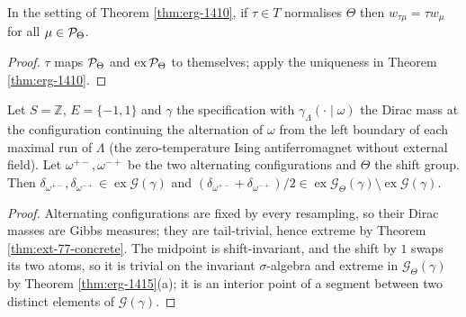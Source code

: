 \begin{corollary}[Georgii (14.11)]
    \label{cor:erg-1411}
    \leanok

    In the setting of Theorem \ref{thm:erg-1410}, if $\tau \in T$ normalises $\Theta$ then
    $w_{\tau\mu} = \tau w_\mu$ for all $\mu \in \mathcal{P}_\Theta$.
\end{corollary}
\begin{proof}
    \leanok
    $\tau$ maps $\mathcal{P}_\Theta$ and $\operatorname{ex}\mathcal{P}_\Theta$ to themselves; apply the
    uniqueness in Theorem \ref{thm:erg-1410}.
\end{proof}

\begin{example}[Georgii (14.16)]
    \label{ex:erg-1416}
    \leanok

    Let $S = \mathbb Z$, $E = \{-1, 1\}$ and $\gamma$ the specification with
    $\gamma_\Lambda(\cdot \mid \omega)$ the Dirac mass at the configuration continuing the
    alternation of $\omega$ from the left boundary of each maximal run of $\Lambda$ (the
    zero-temperature Ising antiferromagnet without external field). Let $\omega^{+-}, \omega^{-+}$
    be the two alternating configurations and $\Theta$ the shift group. Then
    $\delta_{\omega^{+-}}, \delta_{\omega^{-+}} \in \operatorname{ex}\mathcal G(\gamma)$ and
    $(\delta_{\omega^{+-}} + \delta_{\omega^{-+}})/2 \in
    \operatorname{ex}\mathcal G_\Theta(\gamma) \setminus \operatorname{ex}\mathcal G(\gamma)$.
\end{example}
\begin{proof}
    \leanok
    Alternating configurations are fixed by every resampling, so their Dirac masses are Gibbs
    measures; they are tail-trivial, hence extreme by Theorem \ref{thm:ext-77-concrete}. The midpoint is
    shift-invariant, and the shift by $1$ swaps its two atoms, so it is trivial on the invariant
    $\sigma$-algebra and extreme in $\mathcal G_\Theta(\gamma)$ by Theorem \ref{thm:erg-1415}(a);
    it is an interior point of a segment between two distinct elements of $\mathcal G(\gamma)$.
\end{proof}

